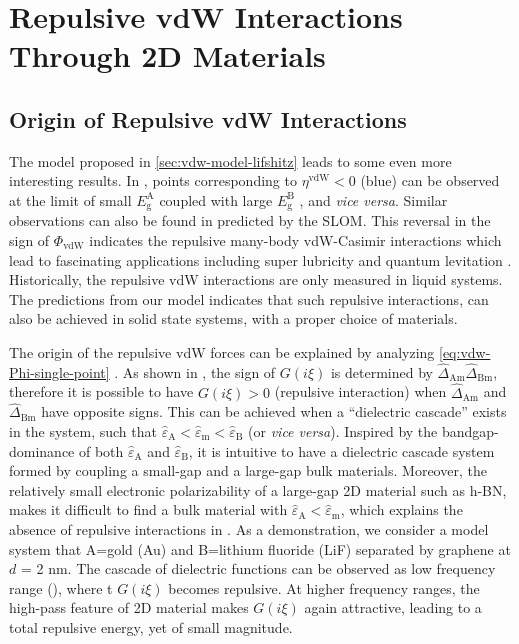 \section{Repulsive vdW Interactions Through 2D Materials}
\label{sec:vdw-repuls-vdw-inter}

\subsection{Origin of Repulsive vdW Interactions}
\label{sec:vdw-origin-repulsive-vdw}

The model proposed in \autoref{sec:vdw-model-lifshitz} leads to some
even more interesting results.
%
In , points corresponding to
\(\eta^{\mathrm{vdW}} < 0\) (blue) can be observed at the limit of
small \(E_{\mathrm{g}}^{\mathrm{A}}\) coupled with large
\(E_{\mathrm{g}}^{\mathrm{B}}\) , and \emph{vice versa}. Similar
observations can also be found in  predicted by
the SLOM.
%
This reversal in the sign of $\Phi_{\mathrm{vdW}}$ indicates the
repulsive many-body vdW-Casimir interactions
\cite{Munday_2009_repul,Zhao_2019_casimir_trap} which lead to
fascinating applications including super lubricity
\cite{Feiler_2008_superlubri} and quantum levitation
\cite{MUNDAY_2010_repul}.
%
Historically, the repulsive vdW interactions are only measured in
liquid systems. The predictions from our model
indicates that such repulsive interactions, can also be achieved in
solid state systems, with a proper choice of materials.

The origin of the repulsive vdW forces can be explained by analyzing
\autoref{eq:vdw-Phi-single-point} .
%
As shown in , the sign of $G(i \xi)$ is
determined by $\hat{\Delta}_{\mathrm{Am}} \hat{\Delta}_{\mathrm{Bm}}$,
therefore it is possible to have $G(i \xi) > 0$ (repulsive
interaction)  when
$\hat{\Delta}_{\mathrm{Am}}$ and $\hat{\Delta}_{\mathrm{Bm}}$ have
opposite signs.
%
This can be achieved when a ``dielectric cascade'' exists in the
system, such that
\(\hat{\varepsilon}_{\mathrm{A}} < \hat{\varepsilon}_{\mathrm{m}} <
\hat{\varepsilon}_{\mathrm{B}}\) (or \emph{vice versa}).
%
Inspired by the bandgap-dominance of both
\(\hat{\varepsilon}_{\mathrm{A}}\) and
\(\hat{\varepsilon}_{\mathrm{B}}\), it is intuitive to have a
dielectric cascade system formed by coupling a small-gap and a
large-gap bulk materials.
%
Moreover, the relatively small electronic polarizability of a
large-gap 2D material such as h-BN, makes it difficult to find a bulk
material with
\(\hat{\varepsilon}_{\mathrm{A}} < \hat{\varepsilon}_{\mathrm{m}}\),
which explains the absence of repulsive interactions in .
%
As a demonstration, we consider a model system
that A=gold (Au) and B=lithium fluoride (LiF) separated by graphene at \(d\)
= 2 nm.
%
The cascade of dielectric functions can be observed as low frequency
range (), where t
\(G(i \xi)\) becomes repulsive. At higher frequency ranges, the
high-pass feature of 2D material makes \(G(i \xi)\) again attractive,
leading to a total repulsive energy, yet of small magnitude.



